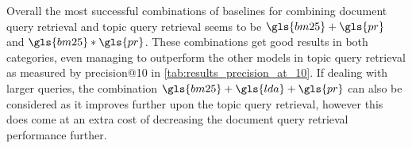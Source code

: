 Overall the most successful combinations of baselines for combining document query retrieval and topic query retrieval seems to be $\gls{bm25}+\gls{pr}$ and $\gls{bm25}*\gls{pr}$.
These combinations get good results in both categories, even managing to outperform the other models in topic query retrieval as measured by precision@10 in \autoref{tab:results_precision_at_10}.
If dealing with larger queries, the combination $\gls{bm25}+\gls{lda}+\gls{pr}$ can also be considered as it improves further upon the topic query retrieval, however this does come at an extra cost of decreasing the document query retrieval performance further.